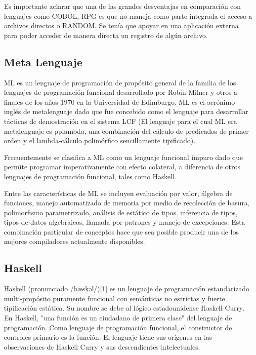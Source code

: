 \documentclass[twoside,twocolumn]{article}
\begin{document}
Es importante aclarar que una de las grandes desventajas en comparación con lenguajes como COBOL, RPG es que no maneja como parte integrada el acceso a archivos directos o RANDOM. Se tenía que apoyar en una aplicación externa para poder acceder de manera directa un registro de algún archivo.

\subsection{Meta Lenguaje}

ML es un lenguaje de programación de propósito general de la familia de los lenguajes de programación funcional desarrollado por Robin Milner y otros a finales de los años 1970 en la Universidad de Edimburgo. ML es el acrónimo inglés de metalenguaje dado que fue concebido como el lenguaje para desarrollar tácticas de demostración en el sistema LCF (El lenguaje para el cual ML era metalenguaje es pplambda, una combinación del cálculo de predicados de primer orden y el lambda-cálculo polimórfico sencillamente tipificado).

Frecuentemente se clasifica a ML como un lenguaje funcional impuro dado que permite programar imperativamente con efecto colateral, a diferencia de otros lenguajes de programación funcional, tales como Haskell.

Entre las características de ML se incluyen evaluación por valor, álgebra de funciones, manejo automatizado de memoria por medio de recolección de basura, polimorfismo parametrizado, análisis de estático de tipos, inferencia de tipos, tipos de datos algebraicos, llamada por patrones y manejo de excepciones. Esta combinación particular de conceptos hace que sea posible producir una de los mejores compiladores actualmente disponibles.

\subsection{Haskell}

Haskell (pronunciado /hæskəl/)[1] es un lenguaje de programación estandarizado multi-propósito puramente funcional con semánticas no estrictas y fuerte tipificación estática. Su nombre se debe al lógico estadounidense Haskell Curry. En Haskell, "una función es un ciudadano de primera clase" del lenguaje de programación. Como lenguaje de programación funcional, el constructor de controles primario es la función. El lenguaje tiene sus orígenes en las observaciones de Haskell Curry y sus descendientes intelectuales.
\end{document}
